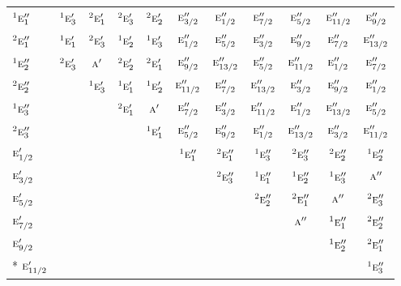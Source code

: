 \documentclass[10pt,a4paper]{article}
\numberwithin{equation}{section}
\newcommand{\irr}[1]{\text{\normalfont\scshape #1}}
\newcommand{\conjpair}[1]{{}^{#1}}
\begin{document}
{\begin{longtable}{@{}lcccccccccc@{}}
$\conjpair{1}\irr{e}_{1}''$ & $\conjpair{1}\irr{e}_{3}'$ & $\conjpair{2}\irr{e}_{1}'$ & $\conjpair{2}\irr{e}_{3}'$ & $\conjpair{2}\irr{e}_{2}'$ & $\irr{e}_{3/2}''$ & $\irr{e}_{1/2}''$ & $\irr{e}_{7/2}''$ & $\irr{e}_{5/2}''$ & $\irr{e}_{11/2}''$ & $\irr{e}_{9/2}''$\\
$\conjpair{2}\irr{e}_{1}''$ & $\conjpair{1}\irr{e}_{1}'$ & $\conjpair{2}\irr{e}_{3}'$ & $\conjpair{1}\irr{e}_{2}'$ & $\conjpair{1}\irr{e}_{3}'$ & $\irr{e}_{1/2}''$ & $\irr{e}_{5/2}''$ & $\irr{e}_{3/2}''$ & $\irr{e}_{9/2}''$ & $\irr{e}_{7/2}''$ & $\irr{e}_{13/2}''$\\
$\conjpair{1}\irr{e}_{2}''$ & $\conjpair{2}\irr{e}_{3}'$ & $\irr{a}'$ & $\conjpair{2}\irr{e}_{2}'$ & $\conjpair{2}\irr{e}_{1}'$ & $\irr{e}_{9/2}''$ & $\irr{e}_{13/2}''$ & $\irr{e}_{5/2}''$ & $\irr{e}_{11/2}''$ & $\irr{e}_{1/2}''$ & $\irr{e}_{7/2}''$\\
$\conjpair{2}\irr{e}_{2}''$ &  & $\conjpair{1}\irr{e}_{3}'$ & $\conjpair{1}\irr{e}_{1}'$ & $\conjpair{1}\irr{e}_{2}'$ & $\irr{e}_{11/2}''$ & $\irr{e}_{7/2}''$ & $\irr{e}_{13/2}''$ & $\irr{e}_{3/2}''$ & $\irr{e}_{9/2}''$ & $\irr{e}_{1/2}''$\\
$\conjpair{1}\irr{e}_{3}''$ &  &  & $\conjpair{2}\irr{e}_{1}'$ & $\irr{a}'$ & $\irr{e}_{7/2}''$ & $\irr{e}_{3/2}''$ & $\irr{e}_{11/2}''$ & $\irr{e}_{1/2}''$ & $\irr{e}_{13/2}''$ & $\irr{e}_{5/2}''$\\
$\conjpair{2}\irr{e}_{3}''$ &  &  &  & $\conjpair{1}\irr{e}_{1}'$ & $\irr{e}_{5/2}''$ & $\irr{e}_{9/2}''$ & $\irr{e}_{1/2}''$ & $\irr{e}_{13/2}''$ & $\irr{e}_{3/2}''$ & $\irr{e}_{11/2}''$\\
$\irr{e}_{1/2}'$ &  &  &  &  & $\conjpair{1}\irr{e}_{1}''$ & $\conjpair{2}\irr{e}_{1}''$ & $\conjpair{1}\irr{e}_{3}''$ & $\conjpair{2}\irr{e}_{3}''$ & $\conjpair{2}\irr{e}_{2}''$ & $\conjpair{1}\irr{e}_{2}''$\\
$\irr{e}_{3/2}'$ &  &  &  &  &  & $\conjpair{2}\irr{e}_{3}''$ & $\conjpair{1}\irr{e}_{1}''$ & $\conjpair{1}\irr{e}_{2}''$ & $\conjpair{1}\irr{e}_{3}''$ & $\irr{a}''$\\
$\irr{e}_{5/2}'$ &  &  &  &  &  &  & $\conjpair{2}\irr{e}_{2}''$ & $\conjpair{2}\irr{e}_{1}''$ & $\irr{a}''$ & $\conjpair{2}\irr{e}_{3}''$\\
$\irr{e}_{7/2}'$ &  &  &  &  &  &  &  & $\irr{a}''$ & $\conjpair{1}\irr{e}_{1}''$ & $\conjpair{2}\irr{e}_{2}''$\\
$\irr{e}_{9/2}'$ &  &  &  &  &  &  &  &  & $\conjpair{1}\irr{e}_{2}''$ & $\conjpair{2}\irr{e}_{1}''$\\*
$\irr{e}_{11/2}'$ &  &  &  &  &  &  &  &  &  & $\conjpair{1}\irr{e}_{3}''$\\
\bottomrule\end{longtable}}
\end{document}
